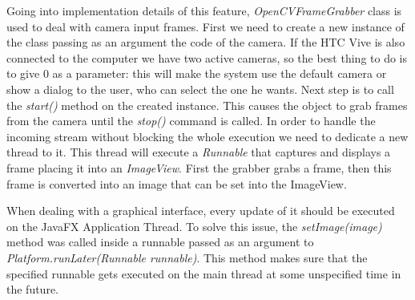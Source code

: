 \documentclass[binding=0.6cm,LaM]{sapthesis}
\begin{document}
Going into implementation details of this feature, \textit{OpenCVFrameGrabber} class is used to deal with camera input frames. First we need to create a new instance of the class passing as an argument the code of the camera. If the HTC Vive is also connected to the computer we have two active cameras, so the best thing to do is to give 0 as a parameter: this will make the system use the default camera or show a dialog to the user, who can select the one he wants. Next step is to call the \textit{start()} method on the created instance. This causes the object to grab frames from the camera until the \textit{stop()} command is called. In order to handle the incoming stream without blocking the whole execution we need to dedicate a new thread to it. This thread will execute a \textit{Runnable} that captures and displays a frame placing it into an \textit{ImageView}. First the grabber grabs a frame, then this frame is converted into an image that can be set into the ImageView.

When dealing with a graphical interface, every update of it should be executed on the JavaFX Application Thread. To solve this issue, the \textit{setImage(image)} method was called inside a runnable passed as an argument to \textit{Platform.runLater(Runnable runnable)}. This method makes sure that the specified runnable gets executed on the main thread at some unspecified time in the future.
\end{document}

